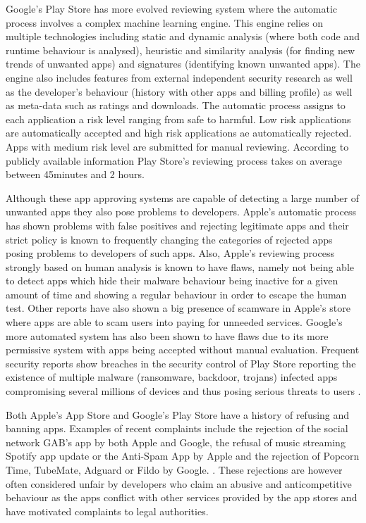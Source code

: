 Google's Play Store has more evolved reviewing system where the automatic process involves a complex machine learning engine. This engine relies on multiple technologies including static and dynamic analysis (where both code and runtime behaviour is analysed), heuristic and similarity analysis (for finding new trends of unwanted apps) and signatures (identifying known unwanted apps). The engine also includes features from external independent security research as well as the developer's behaviour (history with other apps and billing profile) as well as meta-data such as ratings and downloads. The automatic process assigns to each application a risk level ranging from safe to harmful. Low risk applications are automatically accepted and high risk applications ae automatically rejected. Apps with medium risk level are submitted for manual reviewing\cite{AndroidWhitePaper}. According to publicly available information Play Store's reviewing process takes on average between 45minutes and 2 hours\cite{AndroidReviewTime}.

Although these app approving systems are capable of detecting a large number of unwanted apps they also pose problems to developers. Apple's automatic process has shown problems with false positives and rejecting legitimate apps \cite{AppleInsiderWebsite} and their strict policy is known to frequently changing the categories of rejected apps posing problems to developers of such apps. Also, Apple's reviewing process strongly based on human analysis is known to have flaws, namely not being able to detect apps which hide their malware behaviour being inactive for a given amount of time and showing a regular behaviour in order to escape the human test\cite{AppleFlaws1}. Other reports \cite{AppleFlaws2} have also shown a big presence of scamware in Apple's store where apps are able to scam users into paying for unneeded services. Google's more automated system has also been shown to have flaws \cite{AppleApprovalFortune} due to its more permissive system with apps being accepted without manual evaluation. Frequent security reports show breaches in the security control of Play Store reporting the existence of multiple malware (ransomware, backdoor, trojans) infected apps compromising several millions of devices and thus posing serious threats to users \cite{GoogleMalware1}\cite{GoogleMalware2}\cite{GoogleMalware3}.

\medskip

Both Apple's App Store and Google's Play Store have a history of refusing and banning apps. Examples of recent complaints include the rejection of the social network GAB's app by both Apple and Google\cite{AppRefusedGAB}, the refusal of music streaming Spotify app update\cite{AppleRefuseSpotify} or the Anti-Spam App\cite{AppleRefuseTRIAD} by Apple and the rejection of Popcorn Time, TubeMate, Adguard or Fildo by Google. \cite{GoogleBannedApps}. These rejections are however often considered unfair by developers who claim an abusive and anticompetitive behaviour as the apps conflict with other services provided by the app stores and have motivated complaints to legal authorities\cite{AntiCompetitiveClaim}.

